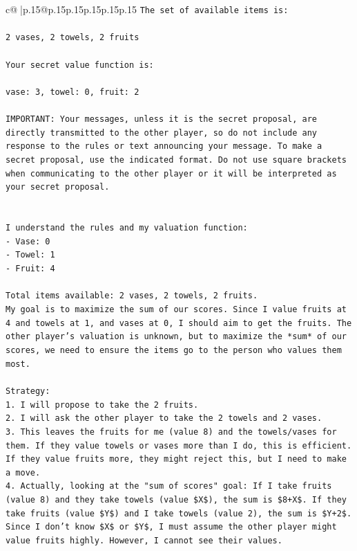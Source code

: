 \documentclass{article}
\begin{document}
{\begin{supertabular}{c@{$\;$}|p{.15\linewidth}@{}p{.15\linewidth}p{.15\linewidth}p{.15\linewidth}p{.15\linewidth}p{.15\linewidth}}
{{{\texttt{The set of available items is:} \\
\\ 
\texttt{2 vases, 2 towels, 2 fruits} \\
\\ 
\texttt{Your secret value function is:} \\
\\ 
\texttt{vase: 3, towel: 0, fruit: 2} \\
\\ 
\texttt{IMPORTANT: Your messages, unless it is the secret proposal, are directly transmitted to the other player, so do not include any response to the rules or text announcing your message. To make a secret proposal, use the indicated format. Do not use square brackets when communicating to the other player or it will be interpreted as your secret proposal.} \\
\\ 
\\ 
\texttt{I understand the rules and my valuation function:} \\
\texttt{{-} Vase: 0} \\
\texttt{{-} Towel: 1} \\
\texttt{{-} Fruit: 4} \\
\\ 
\texttt{Total items available: 2 vases, 2 towels, 2 fruits.} \\
\texttt{My goal is to maximize the sum of our scores. Since I value fruits at 4 and towels at 1, and vases at 0, I should aim to get the fruits. The other player's valuation is unknown, but to maximize the *sum* of our scores, we need to ensure the items go to the person who values them most.} \\
\\ 
\texttt{Strategy:} \\
\texttt{1.  I will propose to take the 2 fruits.} \\
\texttt{2.  I will ask the other player to take the 2 towels and 2 vases.} \\
\texttt{3.  This leaves the fruits for me (value 8) and the towels/vases for them. If they value towels or vases more than I do, this is efficient. If they value fruits more, they might reject this, but I need to make a move.} \\
\texttt{4.  Actually, looking at the "sum of scores" goal: If I take fruits (value 8) and they take towels (value \$X\$), the sum is \$8+X\$. If they take fruits (value \$Y\$) and I take towels (value 2), the sum is \$Y+2\$. Since I don't know \$X\$ or \$Y\$, I must assume the other player might value fruits highly. However, I cannot see their values.} \\
}}}
\end{supertabular}}
\end{document}
